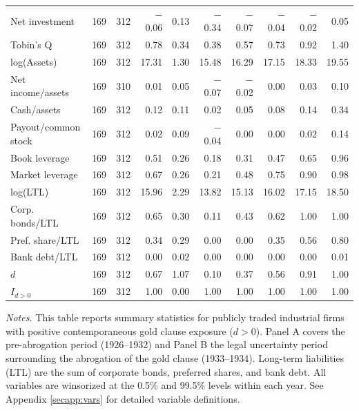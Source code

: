 \begin{table}[p]
\begin{threeparttable}
\begin{tabular}{lrrrrrrrrr}
            \midrule
            Net investment & 169 & 312 & $-$0.06 & 0.13 & $-$0.34 & $-$0.07 & $-$0.04 & $-$0.02 & 0.05 \\
            Tobin's Q & 169 & 312 & 0.78 & 0.34 & 0.38 & 0.57 & 0.73 & 0.92 & 1.40 \\
            log(Assets) & 169 & 312 & 17.31 & 1.30 & 15.48 & 16.29 & 17.15 & 18.33 & 19.55 \\
            Net income/assets & 169 & 310 & 0.01 & 0.05 & $-$0.07 & $-$0.02 & 0.00 & 0.03 & 0.10 \\
            Cash/assets & 169 & 312 & 0.12 & 0.11 & 0.02 & 0.05 & 0.08 & 0.14 & 0.34 \\
            Payout/common stock & 169 & 312 & 0.02 & 0.09 & $-$0.04 & 0.00 & 0.00 & 0.02 & 0.14 \\
            Book leverage & 169 & 312 & 0.51 & 0.26 & 0.18 & 0.31 & 0.47 & 0.65 & 0.96 \\
            Market leverage & 169 & 312 & 0.67 & 0.26 & 0.21 & 0.48 & 0.75 & 0.90 & 0.98 \\
            log(LTL) & 169 & 312 & 15.96 & 2.29 & 13.82 & 15.13 & 16.02 & 17.15 & 18.50 \\
            Corp. bonds/LTL & 169 & 312 & 0.65 & 0.30 & 0.11 & 0.43 & 0.62 & 1.00 & 1.00 \\
            Pref. share/LTL & 169 & 312 & 0.34 & 0.29 & 0.00 & 0.00 & 0.35 & 0.56 & 0.80 \\
            Bank debt/LTL & 169 & 312 & 0.00 & 0.02 & 0.00 & 0.00 & 0.00 & 0.00 & 0.01 \\
            \ensuremath{d} & 169 & 312 & 0.67 & 1.07 & 0.10 & 0.37 & 0.56 & 0.91 & 1.00 \\
            \ensuremath{I_{d>0}} & 169 & 312 & 1.00 & 0.00 & 1.00 & 1.00 & 1.00 & 1.00 & 1.00 \\
            \bottomrule
        \end{tabular}
    \end{threeparttable}

    \vspace*{3mm} \justifying \noindent
\scriptsize{\textit{Notes.} This table reports summary statistics for publicly traded industrial firms with positive contemporaneous gold clause exposure ($d > 0$). Panel A covers the pre-abrogation period (1926--1932) and Panel B the legal uncertainty period surrounding the abrogation of the gold clause (1933--1934). Long-term liabilities (LTL) are the sum of corporate bonds, preferred shares, and bank debt. All variables are winsorized at the 0.5\% and 99.5\% levels within each year. See Appendix \ref{secapp:vars} for detailed variable definitions.}
\end{table}